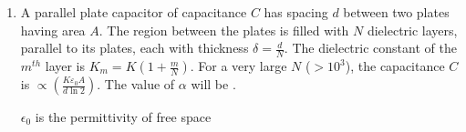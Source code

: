
\begin{enumerate}
    \item A parallel plate capacitor of capacitance $C$ has spacing $d$ between two plates having area $A$. The region between the plates is filled with $N$ dielectric layers, parallel to its plates, each with thickness $\delta = \frac{d}{N}$. The dielectric constant of the $m^{th}$ layer is $K_m = K\left( 1 + \frac{m}{N} \right)$. For a very large $N$ ($> 10^3$), the capacitance $C$ is $\propto \left(\frac{K\varepsilon_0A}{d \ln 2}\right)$. The value of $\alpha$ will be \underline{\hspace{2cm}}.
    \item[$\epsilon_0$ is the permittivity of free space]
\end{enumerate}
